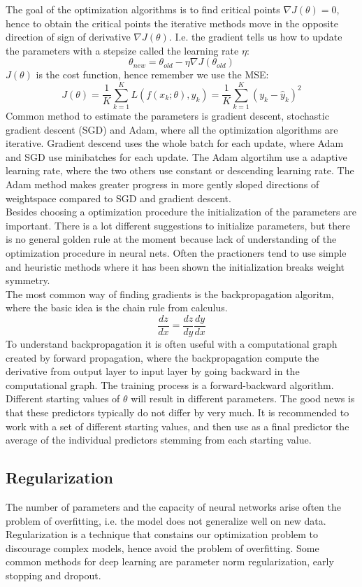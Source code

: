 The goal of the optimization algorithms is to find critical points $\nabla J(\theta)=0$, hence to obtain the critical points the iterative methods move in the opposite direction of sign of derivative $\nabla J(\theta)$. I.e. the gradient tells us how to update the parameters with a stepsize called the learning rate $\eta$:
$$\theta_{new}=\theta_{old} - \eta \nabla J(\theta_{old}) $$
$J(\theta)$ is the cost function, hence remember we use the MSE:
$$J(\theta)= \frac{1}{K}\sum_{k=1}^{K} L(f(x_k;\theta),y_k)=\frac{1}{K}\sum_{k=1}^{K} (y_k-\hat{y}_k)^2$$
Common method to estimate the parameters is gradient descent, stochastic gradient descent (SGD) and Adam, where all the optimization algorithms are iterative. Gradient descend uses the whole batch for each update, where Adam and SGD use minibatches for each update. The Adam algortihm use a adaptive learning rate, where the two others use constant or descending learning rate. The Adam method makes greater progress in more gently sloped directions of weightspace compared to SGD and gradient descent. \\

Besides choosing a optimization procedure the initialization of the parameters are important. There is a lot different suggestions to initialize parameters, but there is no general golden rule at the moment because lack of understanding of the optimization procedure in neural nets. Often the practioners tend to use simple and heuristic methods where it has been shown the initialization breaks weight symmetry.\\

The most common way of finding gradients is the backpropagation algoritm, where the basic idea is the chain rule from calculus.
$$\frac{dz}{dx}= \frac{dz}{dy} \frac{dy}{dx}$$
To understand backpropagation it is often useful with a computational graph created by forward propagation, where the backpropagation compute the derivative from output layer to input layer by going backward in the computational graph. The training process is a forward-backward algorithm. Different starting values of $\theta$ will result in different parameters. The good news is that these predictors typically do not differ by very much. It is recommended to work with a set of different starting values, and then use as a final predictor the average of the individual predictors stemming from each starting value.

\subsection{Regularization}\label{regularization}
The number of parameters and the capacity of neural networks arise often the problem of overfitting, i.e. the model does not generalize well on new data. Regularization is a technique that constains our optimization problem to discourage complex models, hence avoid the problem of overfitting. Some common methods for deep learning are parameter norm regularization, early stopping and dropout.\\

